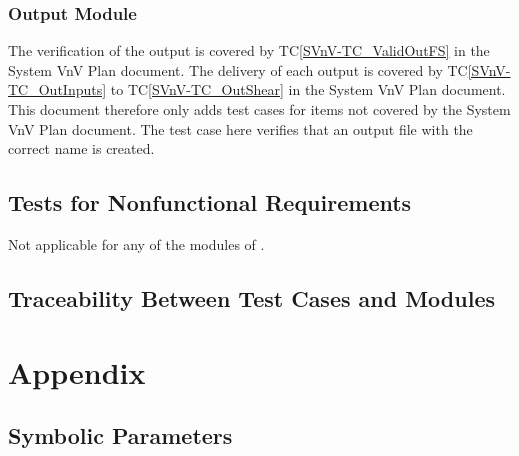 \documentclass[12pt, titlepage]{article}
\newcommand{\tcref}[1]{TC\ref{#1}}
\begin{document}
\subsubsection{Output Module}
The verification of the output is covered by \tcref{SVnV-TC_ValidOutFS} in the 
System VnV Plan document. The delivery of each output is covered by 
\tcref{SVnV-TC_OutInputs} to \tcref{SVnV-TC_OutShear} in the System VnV Plan 
document. This document therefore only adds test cases for items not covered by 
the System VnV Plan document. The test case here verifies that an output file 
with the correct name is created.

\subsection{Tests for Nonfunctional Requirements}

Not applicable for any of the modules of \progname{}.

\subsection{Traceability Between Test Cases and Modules}






\newpage

\section{Appendix}


\subsection{Symbolic Parameters}

\end{document}
